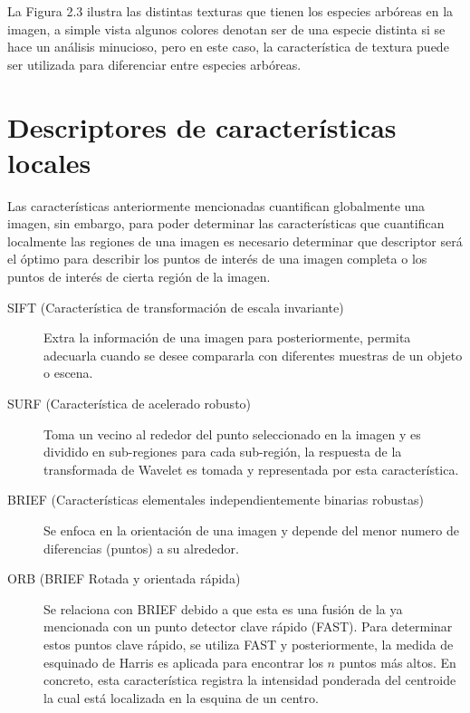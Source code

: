 La Figura 2.3 ilustra las distintas texturas que tienen los especies arbóreas en la imagen, a simple vista algunos colores denotan ser de una especie distinta si se hace un análisis minucioso, pero en este caso, la característica de textura puede ser utilizada para diferenciar entre especies arbóreas.
\pagebreak

\section{Descriptores de características locales}
Las características anteriormente mencionadas cuantifican globalmente una imagen, sin embargo, para poder determinar las características que cuantifican localmente las regiones de una imagen es necesario determinar que descriptor será el óptimo para describir los puntos de interés de una imagen completa o los puntos de interés de cierta región de la imagen. 

\begin{description}
\item[SIFT (Característica de transformación de escala invariante)]{Extra la información de una imagen para posteriormente, permita adecuarla cuando se desee compararla con diferentes muestras de un objeto o escena.}
\end{description}

\begin{description}
\item[SURF (Característica de acelerado robusto)]{Toma un vecino al rededor del punto seleccionado en la imagen y es dividido en sub-regiones para cada sub-región, la respuesta de la transformada de Wavelet es tomada y representada por esta característica.}
\end{description}
 
\begin{description}
\item[BRIEF (Características elementales  independientemente binarias robustas)]{Se enfoca en la orientación de una imagen y depende del menor numero de diferencias (puntos) a su alrededor.}
\end{description}

\begin{description}
\item[ORB (BRIEF Rotada y orientada rápida)]{Se relaciona con BRIEF debido a
que esta es una fusión de la ya mencionada con un punto detector clave rápido (FAST). Para determinar estos puntos clave rápido, se utiliza FAST y posteriormente, la medida de esquinado de Harris es aplicada para encontrar los $n$ puntos más altos. En concreto, esta característica registra la intensidad ponderada del centroide la cual está localizada en la esquina de un centro.}
\end{description}


